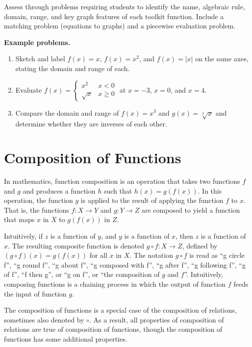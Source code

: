 Assess through problems requiring students to identify the name, algebraic rule, domain,
range, and key graph features of each toolkit function. Include a matching problem
(equations to graphs) and a piecewise evaluation problem.

\textbf{Example problems.}

\begin{enumerate}
    \item Sketch and label $f(x) = x$, $f(x) = x^2$, and $f(x) = |x|$ on the same axes, stating the domain and range of each.
    \item Evaluate $f(x) = \begin{cases} x^2 & x < 0 \\ \sqrt{x} & x \geq 0 \end{cases}$ at $x = -3$, $x = 0$, and $x = 4$.
    \item Compare the domain and range of $f(x) = x^3$ and $g(x) = \sqrt[3]{x}$ and determine whether they are inverses of each other.
\end{enumerate}

\section{Composition of Functions}
\label{sec:comp-37f3}
In mathematics, function composition is an operation that takes two functions $f$ and $g$ and produces a function $h$ such that $h(x) = g(f(x))$. In this operation, the function $g$ is applied to the result of applying the function $f$ to $x$. That is, the functions $f : X \to Y$ and $g : Y \to Z$ are composed to yield a function that maps $x$ in $X$ to $g(f(x))$ in $Z$.

Intuitively, if $z$ is a function of $y$, and $y$ is a function of $x$, then $z$ is a function of $x$. The resulting composite function is denoted $g \circ f : X \to Z$, defined by $(g \circ f)(x) = g(f(x))$ for all $x$ in $X$. The notation $g \circ f$ is read as ``g circle f'', ``g round f'', ``g about f'', ``g composed with f'', ``g after f'', ``g following f'', ``g of f'', ``f then g'', or ``g on f'', or ``the composition of $g$ and $f$''. Intuitively, composing functions is a chaining process in which the output of function $f$ feeds the input of function $g$.

The composition of functions is a special case of the composition of relations, sometimes also denoted by $\circ$. As a result, all properties of composition of relations are true of composition of functions, though the composition of functions has some additional properties.

